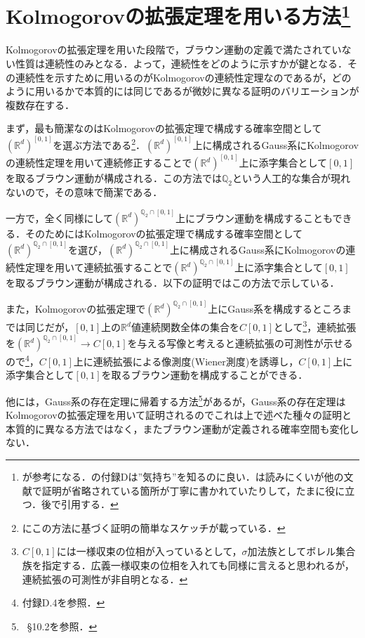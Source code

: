 \documentclass[dvipdfmx]{jsarticle}
\begin{document}
\section{Kolmogorovの拡張定理を用いる方法\footnote{\cite{sugiura}が参考になる．\cite{hattori}の付録Dは''気持ち''を知るのに良い．\cite{kato}は読みにくいが他の文献で証明が省略されている箇所が丁寧に書かれていたりして，たまに役に立つ．後で引用する．}}
Kolmogorovの拡張定理を用いた段階で，ブラウン運動の定義で満たされていない性質は連続性のみとなる．よって，連続性をどのように示すかが鍵となる．その連続性を示すために用いるのがKolmogorovの連続性定理なのであるが，どのように用いるかで本質的には同じであるが微妙に異なる証明のバリエーションが複数存在する．\par
まず，最も簡潔なのはKolmogorovの拡張定理で構成する確率空間として$(\mathbb{R}^d)^{[0,1]}$を選ぶ方法である\footnote{\cite{kumagai}にこの方法に基づく証明の簡単なスケッチが載っている．}．$(\mathbb{R}^d)^{[0,1]}$上に構成されるGauss系にKolmogorovの連続性定理を用いて連続修正することで$(\mathbb{R}^d)^{[0,1]}$上に添字集合として$[0,1]$を取るブラウン運動が構成される．この方法では$\mathbb{Q}_2$という人工的な集合が現れないので，その意味で簡潔である．\par
一方で，全く同様にして$(\mathbb{R}^d)^{\mathbb{Q}_2\cap [0,1]}$上にブラウン運動を構成することもできる．そのためにはKolmogorovの拡張定理で構成する確率空間として$(\mathbb{R}^d)^{\mathbb{Q}_2\cap [0,1]}$を選び，$(\mathbb{R}^d)^{\mathbb{Q}_2\cap [0,1]}$上に構成されるGauss系にKolmogorovの連続性定理を用いて連続拡張することで$(\mathbb{R}^d)^{\mathbb{Q}_2\cap [0,1]}$上に添字集合として$[0,1]$を取るブラウン運動が構成される．以下の証明ではこの方法で示している．\par
また，Kolmogorovの拡張定理で$(\mathbb{R}^d)^{\mathbb{Q}_2\cap [0,1]}$上にGauss系を構成するところまでは同じだが，$[0,1]$上の$\mathbb{R}^d$値連続関数全体の集合を$C[0,1]$として\footnote{$C[0,1]$には一様収束の位相が入っているとして，$\sigma$加法族としてボレル集合族を指定する．広義一様収束の位相を入れても同様に言えると思われるが，連続拡張の可測性が非自明となる．}，連続拡張を$(\mathbb{R}^d)^{\mathbb{Q}_2\cap [0,1]}\to C[0,1]$を与える写像と考えると連続拡張の可測性が示せるので\footnote{\cite{hattori}付録D.4を参照．}，$C[0,1]$上に連続拡張による像測度(Wiener測度)を誘導し，$C[0,1]$上に添字集合として$[0,1]$を取るブラウン運動を構成することができる．\par
他には，Gauss系の存在定理に帰着する方法\footnote{\cite{kotani}{\ }\S 10.2を参照．}があるが，Gauss系の存在定理はKolmogorovの拡張定理を用いて証明されるのでこれは上で述べた種々の証明と本質的に異なる方法ではなく，またブラウン運動が定義される確率空間も変化しない．
\end{document}
